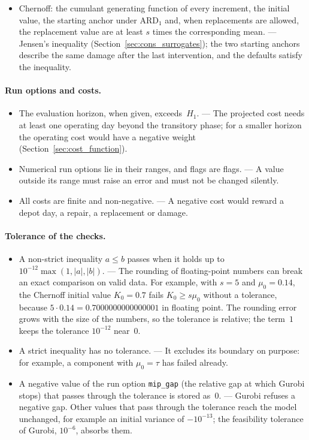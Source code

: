 \documentclass[11pt,a4paper]{article}
\theoremstyle{plain}
\theoremstyle{definition}
\theoremstyle{remark}
\begin{document}
\begin{itemize}
  \item Chernoff: the cumulant generating function of every increment, the initial value, the starting anchor under $\text{ARD}_1$ and, when replacements are allowed, the replacement value are at least $s$ times the corresponding mean. --- Jensen's inequality (Section~\ref{sec:cons_surrogates}); the two starting anchors describe the same damage after the last intervention, and the defaults satisfy the inequality.
\end{itemize}

\paragraph{Run options and costs.}
\begin{itemize}
  \item The evaluation horizon, when given, exceeds~$H_1$. --- The projected cost needs at least one operating day beyond the transitory phase; for a smaller horizon the operating cost would have a negative weight (Section~\ref{sec:cost_function}).
  \item Numerical run options lie in their ranges, and flags are flags. --- A value outside its range must raise an error and must not be changed silently.
  \item All costs are finite and non-negative. --- A negative cost would reward a depot day, a repair, a replacement or damage.
\end{itemize}

\paragraph{Tolerance of the checks.}
\begin{itemize}
  \item A non-strict inequality $a \le b$ passes when it holds up to $10^{-12}\max(1, |a|, |b|)$. --- The rounding of floating-point numbers can break an exact comparison on valid data.
    For example, with $s = 5$ and $\mu_0 = 0.14$, the Chernoff initial value $K_0 = 0.7$ fails $K_0 \ge s\mu_0$ without a tolerance, because $5 \cdot 0.14 = 0.7000000000000001$ in floating point.
    The rounding error grows with the size of the numbers, so the tolerance is relative; the term~$1$ keeps the tolerance $10^{-12}$ near~$0$.
  \item A strict inequality has no tolerance. --- It excludes its boundary on purpose: for example, a component with $\mu_0 = \tau$ has failed already.
  \item A negative value of the run option \texttt{mip\_gap} (the relative gap at which Gurobi stops) that passes through the tolerance is stored as~$0$. --- Gurobi refuses a negative gap.
    Other values that pass through the tolerance reach the model unchanged, for example an initial variance of $-10^{-13}$; the feasibility tolerance of Gurobi, $10^{-6}$, absorbs them.
\end{itemize}
\end{document}
